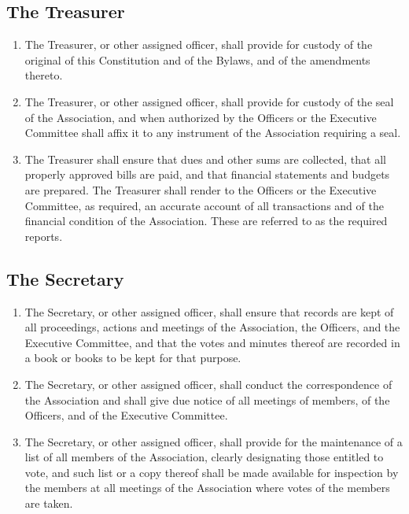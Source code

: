 \documentclass[12pt,letterpaper]{article}
\begin{document}
\subsection{The Treasurer}
\begin{enumerate}
  \item The Treasurer, or other assigned officer, shall provide for custody of the
        original of this Constitution and of the Bylaws, and of the amendments thereto.
  \item The Treasurer, or other assigned officer, shall provide for custody of the
        seal of the Association, and when authorized by the Officers or the Executive
        Committee shall affix it to any instrument of the Association requiring a seal.
  \item The Treasurer shall ensure that dues and other sums are collected, that all
        properly approved bills are paid, and that financial statements and budgets
        are prepared. The Treasurer shall render to the Officers or the Executive
        Committee, as required, an accurate account of all transactions and of the
        financial condition of the Association. These are referred to as the required
        reports.
\end{enumerate}

\subsection{The Secretary}
\begin{enumerate}
  \item The Secretary, or other assigned officer, shall ensure that records are kept
        of all proceedings, actions and meetings of the Association, the Officers,
        and the Executive Committee, and that the votes and minutes thereof are
        recorded in a book or books to be kept for that purpose.
  \item The Secretary, or other assigned officer, shall conduct the correspondence of
        the Association and shall give due notice of all meetings of members, of the
        Officers, and of the Executive Committee.
  \item The Secretary, or other assigned officer, shall provide for the maintenance
        of a list of all members of the Association, clearly designating those
        entitled to vote, and such list or a copy thereof shall be made available for
        inspection by the members at all meetings of the Association where votes of
        the members are taken.
\end{enumerate}
\end{document}
